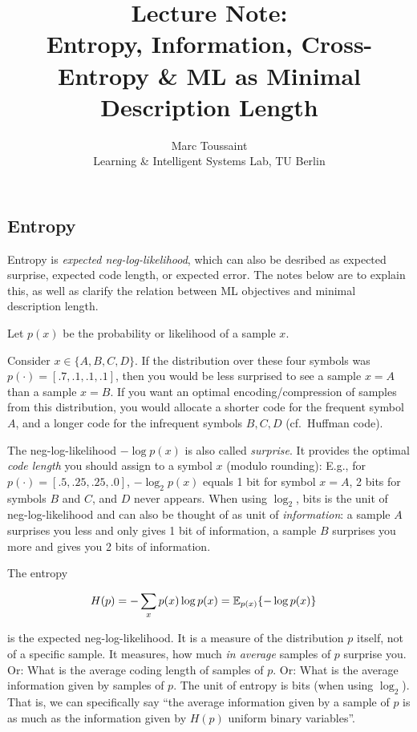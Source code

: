 
\note

\title{Lecture Note:\\ Entropy, Information, Cross-Entropy \& ML as
Minimal Description Length}
\author{Marc Toussaint\\\small Learning \& Intelligent Systems Lab, TU Berlin}

\makeatletter
\renewcommand{\@seccntformat}[1]{}
\makeatother

\notetitle


\subsection{Entropy}

Entropy is \emph{expected neg-log-likelihood}, which can also be
desribed as expected surprise, expected code length, or expected
error. The notes below are to explain this, as well as clarify the relation between ML objectives and minimal description length.

Let $p(x)$ be the probability or likelihood of a sample $x$.

Consider $x \in \{A,B,C,D\}$. If the distribution over these four symbols was $p(\cdot) = [.7, .1, .1, .1]$, then you would be less surprised to see a sample $x=A$ than a sample $x=B$. If you want an optimal encoding/compression of samples from this distribution, you would allocate a shorter code for the frequent symbol $A$, and a longer code for the infrequent symbols $B,C,D$ (cf.\ Huffman code).

The neg-log-likelihood $-\log p(x)$ is also called \emph{surprise}. It
provides the optimal \emph{code length} you should assign to a symbol
$x$ (modulo rounding): E.g., for $p(\cdot) = [.5, .25, .25, .0]$,
$-\log_2 p(x)$ equals 1 bit for symbol $x=A$, 2 bits for symbols $B$
and $C$, and $D$ never appears. When using $\log_2$, bits is the unit of neg-log-likelihood and can also be thought of as unit of \emph{information}: a sample $A$ surprises you less and only gives 1 bit of information, a sample $B$ surprises you more and gives you 2 bits of information.

The entropy

\begin{align}
H(p) &= - \sum_x p(x) \log p(x) = \Exp[p(x)]{-\log p(x)}
\end{align}

is the expected neg-log-likelihood. It is a measure of the
distribution $p$ itself, not of a specific sample. It measures, how
much \emph{in average} samples of $p$ surprise you. Or: What is the
average coding length of samples of $p$. Or: What is the average
information given by samples of $p$. The unit of entropy is bits
(when using $\log_2$). That is, we can specifically say ``the
average information given by a sample of $p$ is as much as the
information given by $H(p)$ uniform binary variables''.

